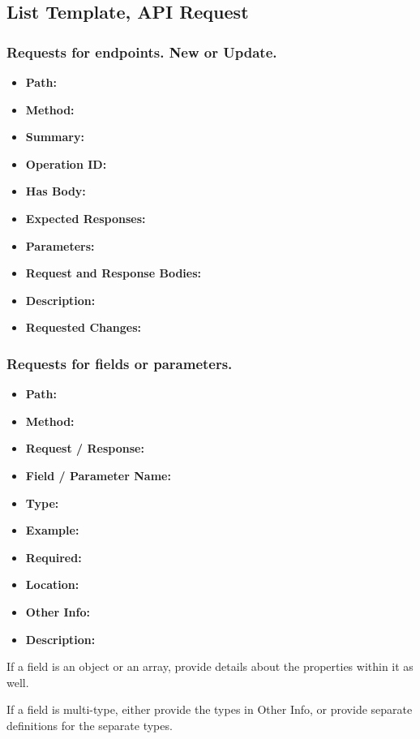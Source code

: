 \documentclass[a4paper]{article}
\begin{document}
\clearpage

\subsection*{List Template, API Request}
\subsubsection*{Requests for endpoints. New or Update.}
\begin{itemize}
	\item \textbf{Path:} 
	\item \textbf{Method:} 
	\item \textbf{Summary:} 
	\item \textbf{Operation ID:} 
	\item \textbf{Has Body:} 
	\item \textbf{Expected Responses:} 
	\item \textbf{Parameters:} 
	\item \textbf{Request and Response Bodies:} 
	\item \textbf{Description:} 
	\item \textbf{Requested Changes:} 
\end{itemize}
\subsubsection*{Requests for fields or parameters.}
\begin{itemize}
	\item \textbf{Path:} 
	\item \textbf{Method:} 
	\item \textbf{Request / Response:} 
	\item \textbf{Field / Parameter Name:} 
	\item \textbf{Type:} 
	\item \textbf{Example:} 
	\item \textbf{Required:} 
	\item \textbf{Location:} 
	\item \textbf{Other Info:} 
	\item \textbf{Description:} 
\end{itemize}

If a field is an object or an array, provide details about the properties within it as well.

If a field is multi-type, either provide the types in Other Info, or provide separate definitions for the separate types.
\end{document}
